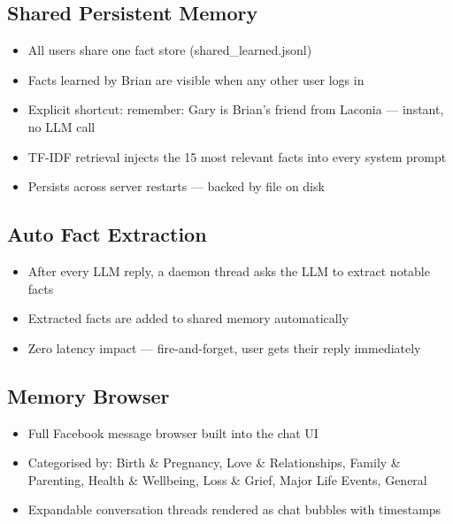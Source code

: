 \documentclass[11pt,a4paper]{article}
\newcommand{\code}[1]{{\ttfamily\small\color{navy}#1}}
\begin{document}
\subsection{Shared Persistent Memory}
\begin{itemize}[leftmargin=1.2em, itemsep=2pt]
  \item All users share one fact store (\code{shared\_learned.jsonl})
  \item Facts learned by Brian are visible when any other user logs in
  \item Explicit shortcut: \code{remember: Gary is Brian's friend from Laconia} — instant, no LLM call
  \item TF-IDF retrieval injects the 15 most relevant facts into every system prompt
  \item Persists across server restarts — backed by file on disk
\end{itemize}

\subsection{Auto Fact Extraction}
\begin{itemize}[leftmargin=1.2em, itemsep=2pt]
  \item After every LLM reply, a daemon thread asks the LLM to extract notable facts
  \item Extracted facts are added to shared memory automatically
  \item Zero latency impact — fire-and-forget, user gets their reply immediately
\end{itemize}

\subsection{Memory Browser}
\begin{itemize}[leftmargin=1.2em, itemsep=2pt]
  \item Full Facebook message browser built into the chat UI
  \item Categorised by: Birth \& Pregnancy, Love \& Relationships, Family \& Parenting,
        Health \& Wellbeing, Loss \& Grief, Major Life Events, General
  \item Expandable conversation threads rendered as chat bubbles with timestamps
\end{itemize}
\end{document}
